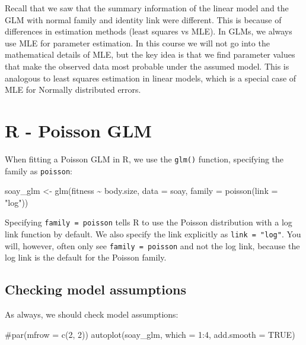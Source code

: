 \documentclass[
  letterpaper,
  8pt,
  a4paper]{book}
\newenvironment{Shaded}{\begin{snugshade}}{\end{snugshade}}
\newcommand{\AttributeTok}[1]{\textcolor[rgb]{0.40,0.45,0.13}{#1}}
\newcommand{\CommentTok}[1]{\textcolor[rgb]{0.37,0.37,0.37}{#1}}
\newcommand{\ConstantTok}[1]{\textcolor[rgb]{0.56,0.35,0.01}{#1}}
\newcommand{\DecValTok}[1]{\textcolor[rgb]{0.68,0.00,0.00}{#1}}
\newcommand{\FunctionTok}[1]{\textcolor[rgb]{0.28,0.35,0.67}{#1}}
\newcommand{\NormalTok}[1]{\textcolor[rgb]{0.00,0.23,0.31}{#1}}
\newcommand{\OtherTok}[1]{\textcolor[rgb]{0.00,0.23,0.31}{#1}}
\newcommand{\SpecialCharTok}[1]{\textcolor[rgb]{0.37,0.37,0.37}{#1}}
\newcommand{\StringTok}[1]{\textcolor[rgb]{0.13,0.47,0.30}{#1}}
\begin{document}
Recall that we saw that the summary information of the linear model and
the GLM with normal family and identity link were different. This is
because of differences in estimation methods (least squares vs MLE). In
GLMs, we always use MLE for parameter estimation. In this course we will
not go into the mathematical details of MLE, but the key idea is that we
find parameter values that make the observed data most probable under
the assumed model. This is analogous to least squares estimation in
linear models, which is a special case of MLE for Normally distributed
errors.

\section*{R - Poisson GLM}\label{r---poisson-glm}


When fitting a Poisson GLM in R, we use the \texttt{glm()} function,
specifying the family as \texttt{poisson}:

\begin{Shaded}
\begin{Highlighting}[]
\NormalTok{soay\_glm }\OtherTok{\textless{}{-}} \FunctionTok{glm}\NormalTok{(fitness }\SpecialCharTok{\textasciitilde{}}\NormalTok{ body.size, }\AttributeTok{data =}\NormalTok{ soay, }\AttributeTok{family =} \FunctionTok{poisson}\NormalTok{(}\AttributeTok{link =} \StringTok{"log"}\NormalTok{))}
\end{Highlighting}
\end{Shaded}

Specifying \texttt{family\ =\ poisson} tells R to use the Poisson
distribution with a log link function by default. We also specify the
link explicitly as \texttt{link\ =\ "log"}. You will, however, often
only see \texttt{family\ =\ poisson} and not the log link, because the
log link is the default for the Poisson family.

\subsection*{Checking model
assumptions}\label{checking-model-assumptions}

As always, we should check model assumptions:

\begin{Shaded}
\begin{Highlighting}[]
\CommentTok{\#par(mfrow = c(2, 2))}
\FunctionTok{autoplot}\NormalTok{(soay\_glm, }\AttributeTok{which =} \DecValTok{1}\SpecialCharTok{:}\DecValTok{4}\NormalTok{, }\AttributeTok{add.smooth =} \ConstantTok{TRUE}\NormalTok{)}
\end{Highlighting}
\end{Shaded}
\end{document}
